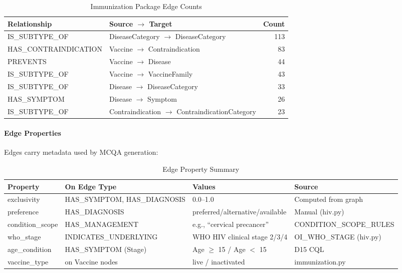 \begin{table}[H]
\centering
\caption{Immunization Package Edge Counts}
\label{tab:imm_edges}
\begin{tabular}{l l r}
\hline
\textbf{Relationship} & \textbf{Source $\rightarrow$ Target} & \textbf{Count} \\
\hline
IS\_SUBTYPE\_OF & DiseaseCategory $\rightarrow$ DiseaseCategory & 113 \\
HAS\_CONTRAINDICATION & Vaccine $\rightarrow$ Contraindication & 83 \\
PREVENTS & Vaccine $\rightarrow$ Disease & 44 \\
IS\_SUBTYPE\_OF & Vaccine $\rightarrow$ VaccineFamily & 43 \\
IS\_SUBTYPE\_OF & Disease $\rightarrow$ DiseaseCategory & 33 \\
HAS\_SYMPTOM & Disease $\rightarrow$ Symptom & 26 \\
IS\_SUBTYPE\_OF & Contraindication $\rightarrow$ ContraindicationCategory & 23 \\
\hline
\end{tabular}
\end{table}

\paragraph{Edge Properties}
Edges carry metadata used by MCQA generation:

\begin{table}[H]
\centering
\caption{Edge Property Summary}
\label{tab:edge_props}
\footnotesize
\begin{tabular}{p{2.2cm} p{3.8cm} p{3.8cm} p{3.5cm}}
\hline
\textbf{Property} & \textbf{On Edge Type} & \textbf{Values} & \textbf{Source} \\
\hline
exclusivity & HAS\_SYMPTOM, HAS\_DIAGNOSIS & 0.0--1.0 & Computed from graph \\
preference & HAS\_DIAGNOSIS & preferred/alternative/available & Manual (hiv.py) \\
condition\_scope & HAS\_MANAGEMENT & e.g., ``cervical precancer'' & CONDITION\_SCOPE\_RULES \\
who\_stage & INDICATES\_UNDERLYING & WHO HIV clinical stage 2/3/4 & OI\_WHO\_STAGE (hiv.py) \\
age\_condition & HAS\_SYMPTOM (Stage) & Age $\geq$ 15 / Age $<$ 15 & D15 CQL \\
vaccine\_type & on Vaccine nodes & live / inactivated & immunization.py \\
\hline
\end{tabular}
\end{table}

